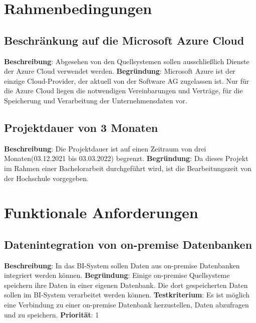 \section{Rahmenbedingungen} 

\subsection{Beschränkung auf die Microsoft Azure Cloud} \label{sec:anforderungsspezifikation:azureCloud}
\textbf{Beschreibung}: Abgesehen von den Quellsystemen sollen ausschließlich Dienste der Azure Cloud verwendet werden.
\newline \textbf{Begründung}: Microsoft Azure ist der einzige Cloud-Provider, der aktuell von der Software AG zugelassen ist. Nur für die Azure Cloud liegen die notwendigen Vereinbarungen und Verträge, für die Speicherung und Verarbeitung der Unternehmensdaten vor.

\subsection{Projektdauer von 3 Monaten} \label{sec:anforderungsspezifikation:projektDauer}
\textbf{Beschreibung}: Die Projektdauer ist auf einen Zeitraum von drei Monaten(03.12.2021 bis 03.03.2022) begrenzt.
\newline \textbf{Begründung}: Da dieses Projekt im Rahmen einer Bachelorarbeit durchgeführt wird, ist die Bearbeitungszeit von der Hochschule vorgegeben.

\section{Funktionale Anforderungen} \label{sec:anforderungsspezifikation:funktionaleAnforderungen}

\subsection{Datenintegration von on-premise Datenbanken} \label{sec:anforderungsspezifikation:datenintegrationOnPremDB}
\textbf{Beschreibung}: In das BI-System sollen Daten aus on-premise Datenbanken integriert werden können.
\newline \textbf{Begründung}: Einige on-premise Quellsysteme speichern ihre Daten in einer eigenen Datenbank. Die dort gespeicherten Daten sollen im BI-System verarbeitet werden können.
\newline \textbf{Testkriterium}: Es ist möglich eine Verbindung zu einer on-premise Datenbank herzustellen, Daten abzufragen und zu speichern.
\newline \textbf{Priorität}: 1

